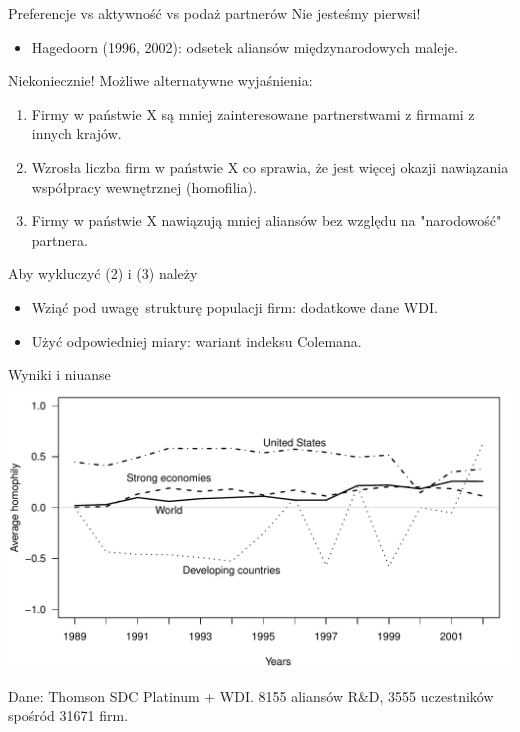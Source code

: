 \documentclass{beamer}
\begin{document}
\begin{frame}{Preferencje vs aktywność vs podaż partnerów}
	Nie jesteśmy pierwsi!
	\begin{itemize}
		\item Hagedoorn (1996, 2002): odsetek aliansów międzynarodowych maleje.
	\end{itemize}

	Niekoniecznie! Możliwe alternatywne wyjaśnienia:
	\begin{footnotesize}
		\begin{enumerate}
			\item Firmy w państwie X są mniej zainteresowane partnerstwami z firmami z
				innych krajów.
			\item Wzrosła liczba firm w państwie X co sprawia, że jest więcej okazji
				nawiązania współpracy wewnętrznej (homofilia).
			\item Firmy w państwie X nawiązują mniej aliansów bez względu na "narodowość"
				partnera.
		\end{enumerate}
	\end{footnotesize}
	Aby wykluczyć (2) i (3) należy
	\begin{itemize}
		\item Wziąć pod uwagę strukturę populacji firm: dodatkowe dane WDI.
		\item Użyć odpowiedniej miary: wariant indeksu Colemana.
	\end{itemize}
\end{frame}


\begin{frame}{Wyniki i niuanse}
	\centering\includegraphics[width=\textwidth]{figure2}

	Dane: Thomson SDC Platinum + WDI.
	8155 aliansów R\&D, 3555 uczestników spośród 31671 firm.
\end{frame}
\end{document}
